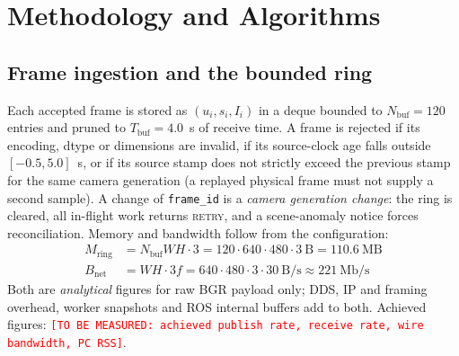 \documentclass[conference]{IEEEtran}
\newcommand{\tbm}[1]{\textcolor{red}{\texttt{[TO BE MEASURED: #1]}}}
\begin{document}
\section{Methodology and Algorithms}
\label{sec:method}

\subsection{Frame ingestion and the bounded ring}
Each accepted frame is stored as $(u_i,s_i,I_i)$ in a deque bounded to $N_{\mathrm{buf}}=120$ entries
and pruned to $T_{\mathrm{buf}}=4.0$~s of receive time. A frame is rejected if its encoding, dtype or
dimensions are invalid, if its source-clock age falls outside $[-0.5,5.0]$~s, or if its source stamp
does not strictly exceed the previous stamp for the same camera generation (a replayed physical frame
must not supply a second sample). A change of \texttt{frame\_id} is a \emph{camera generation change}:
the ring is cleared, all in-flight work returns \textsc{retry}, and a scene-anomaly notice forces
reconciliation. Memory and bandwidth follow from the configuration:
\begin{align}
M_{\mathrm{ring}} &= N_{\mathrm{buf}} W H \cdot 3 = 120\cdot640\cdot480\cdot3\ \mathrm{B} = 110.6\ \mathrm{MB}\\
B_{\mathrm{net}}  &= W H \cdot 3 f = 640\cdot480\cdot3\cdot30\ \mathrm{B/s} \approx 221\ \mathrm{Mb/s}
\end{align}
Both are \emph{analytical} figures for raw BGR payload only; DDS, IP and framing overhead, worker
snapshots and ROS internal buffers add to both. Achieved figures: \tbm{achieved publish rate, receive
rate, wire bandwidth, PC RSS}.
\end{document}
